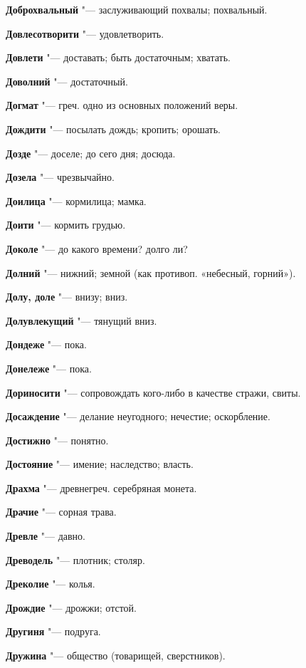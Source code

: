 \begin{mymulticols}
\noindent\textbf{Доброхвальный} "--- заслуживающий похвалы; похвальный. 

\noindent\textbf{Довлесотворити} "--- удовлетворить. 

\noindent\textbf{Довлети} "--- доставать; быть достаточным; хватать. 

\noindent\textbf{Доволний} "--- достаточный. 

\noindent\textbf{Догмат} "--- греч. одно из основных положений веры. 

\noindent\textbf{Дождити} "--- посылать дождь; кропить; орошать. 

\noindent\textbf{Дозде} "--- доселе; до сего дня; досюда. 

\noindent\textbf{Дозела} "--- чрезвычайно. 

\noindent\textbf{Доилица} "--- кормилица; мамка. 

\noindent\textbf{Доити} "--- кормить грудью. 

\noindent\textbf{Доколе} "--- до какого времени? долго ли? 

\noindent\textbf{Долний} "--- нижний; земной (как противоп. «небесный, горний»). 

\noindent\textbf{Долу, доле} "--- внизу; вниз. 

\noindent\textbf{Долувлекущий} "--- тянущий вниз. 

\noindent\textbf{Дондеже} "--- пока. 

\noindent\textbf{Донележе} "--- пока. 

\noindent\textbf{Дориносити} "--- сопровождать кого-либо в качестве стражи, свиты. 

\noindent\textbf{Досаждение} "--- делание неугодного; нечестие; оскорбление. 

\noindent\textbf{Достижно} "--- понятно. 

\noindent\textbf{Достояние} "--- имение; наследство; власть. 

\noindent\textbf{Драхма} "--- древнегреч. серебряная монета. 

\noindent\textbf{Драчие} "--- сорная трава. 

\noindent\textbf{Древле} "--- давно. 

\noindent\textbf{Древодель} "--- плотник; столяр. 

\noindent\textbf{Дреколие} "--- колья. 

\noindent\textbf{Дрождие} "--- дрожжи; отстой. 

\noindent\textbf{Другиня} "--- подруга. 

\noindent\textbf{Дружина} "--- общество (товарищей, сверстников). 


\end{mymulticols}
